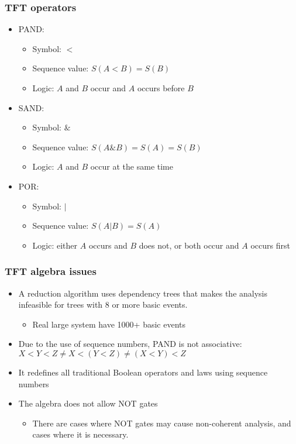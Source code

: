 \begin{frame}
\frametitle{TFT operators}

\begin{itemize}
  \item PAND: 
    \begin{itemize}
      \item Symbol: $<$
      \item Sequence value: $S(A<B) = S(B)$
      \item Logic: $A$ and $B$ occur and $A$ occurs before $B$
    \end{itemize}
  \item SAND: 
    \begin{itemize}
      \item Symbol: $\&$
      \item Sequence value: $S(A\&B) = S(A) = S(B)$
      \item Logic: $A$ and $B$ occur at the same time
    \end{itemize}
  \item POR: 
    \begin{itemize}
      \item Symbol: $|$
      \item Sequence value: $S(A|B) = S(A)$
      \item Logic: either $A$ occurs and $B$ does not, or both occur and $A$ occurs first
    \end{itemize}
\end{itemize}
\end{frame}

\begin{frame}
\frametitle{TFT algebra issues}

\begin{itemize}
  \item A reduction algorithm uses dependency trees that makes the analysis infeasible for trees with \alert<2>{8} or more basic events.
    \begin{itemize}
      \item<2-> Real large system have \alert<2>{1000+} basic events
    \end{itemize}
  \item<3-> Due to the use of sequence numbers, PAND is not associative: $X<Y<Z \ne X<(Y<Z) \ne (X<Y)<Z$ 
  \item<4-> It redefines all traditional Boolean operators and laws using sequence numbers 
  \item<5-> The algebra does not allow NOT gates
    \begin{itemize}
      \item<6-> There are cases where NOT gates may cause non-coherent analysis, and cases where it is necessary.
    \end{itemize}
\end{itemize}
\end{frame}

